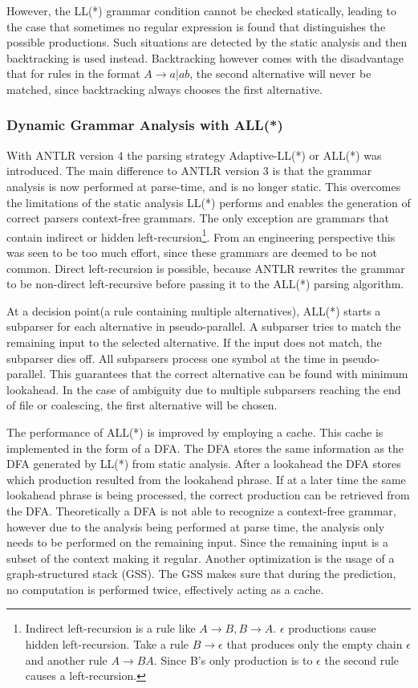 However, the LL(*) grammar condition cannot be checked statically, leading to the case that sometimes no regular expression is found that distinguishes the possible productions. Such situations are detected by the static analysis and then backtracking is used instead. Backtracking however comes with the disadvantage that for rules in the format $A \rightarrow a | ab$, the second alternative will never be matched, since backtracking always chooses the first alternative. 

\subsubsection{Dynamic Grammar Analysis with ALL(*)}

With ANTLR version 4 the parsing strategy Adaptive-LL(*) or ALL(*) was introduced. The main difference to ANTLR version 3 is that the grammar analysis is now performed at parse-time, and is no longer static. This overcomes the limitations of the static analysis LL(*) performs and enables the generation of correct parsers context-free grammars. The only exception are grammars that contain indirect or hidden left-recursion\footnote{Indirect left-recursion is a rule like $A \rightarrow B, B \rightarrow A$. $\epsilon$ productions cause hidden left-recursion. Take a rule $B \rightarrow \epsilon$ that produces only the empty chain $\epsilon$ and another rule $A \rightarrow BA$. Since B's only production is to $\epsilon$ the second rule causes a left-recursion. }. From an engineering perspective this was seen to be too much effort, since these grammars are deemed to be not common. Direct left-recursion is possible, because ANTLR rewrites the grammar to be non-direct left-recursive before passing it to the ALL(*) parsing algorithm. 

At a decision point(a rule containing multiple alternatives), ALL(*) starts a subparser for each alternative in pseudo-parallel. A subparser tries to match the remaining input to the selected alternative. If the input does not match, the subparser dies off. All subparsers process one symbol at the time in pseudo-parallel. This guarantees that the correct alternative can be found with minimum lookahead. In the case of ambiguity due to multiple subparsers reaching the end of file or coalescing, the first alternative will be chosen. 

The performance of ALL(*) is improved by employing a cache. This cache is implemented in the form of a DFA. The DFA stores the same information as the DFA generated by LL(*) from static analysis. After a lookahead the DFA stores which production resulted from the lookahead phrase. If at a later time the same lookahead phrase is being processed, the correct production can be retrieved from the DFA. Theoretically a DFA is not able to recognize a context-free grammar, however due to the analysis being performed at parse time, the analysis only needs to be performed on the remaining input. Since the remaining input is a subset of the context making it regular. Another optimization is the usage of a graph-structured stack (GSS). The GSS makes sure that during the prediction, no computation is performed twice, effectively acting as a cache. 

